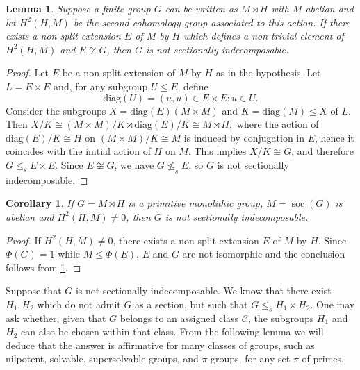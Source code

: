 \documentclass[10pt,a4paper]{amsart}
\newtheorem{corollary}[thm]{Corollary}
\newtheorem{lemma}[thm]{Lemma}
\DeclareMathOperator{\soc}{soc}
\begin{document}
\begin{lemma}\label{l:H2}
Suppose a finite group $G$ can be written as $M \rtimes H$ with $M$ abelian and let $H^2(H,M)$ be the second cohomology group associated to this action. If there exists a non-split extension $E$ of $M$ by $H$ which defines a non-trivial element of $H^2(H,M)$ and $E\not\cong G$, then $G$ is not sectionally indecomposable.
\end{lemma}
\begin{proof}
Let $E$ be a non-split extension of $M$ by $H$ as in the hypothesis. Let $L = E \times E$ and, for any subgroup $U \leq E$, define
$$\mathrm{diag}(U) = {(u,u) \in E \times E : u \in U}.$$
Consider the subgroups $X = \mathrm{diag}(E)(M \times M)$ and $K = \mathrm{diag}(M) \unlhd X$ of $L$. Then
$X/K \cong (M \times M)/K \rtimes \mathrm{diag}(E)/K \cong M \rtimes H,$
where the action of $\mathrm{diag}(E)/K \cong H$ on $(M \times M)/K \cong M$ is induced by conjugation in $E$, hence it coincides with the initial action of $H$ on $M$. This implies $X/K \cong G$, and therefore $G \leq_s E \times E$. Since $E \not\cong G$, we have $G \not\leq_s E$, so $G$ is not sectionally indecomposable.
\end{proof}





\begin{corollary}\label{l:H2m}
   If $G=M\rtimes H$ is a primitive monolithic group,  $M=\soc(G)$ is abelian and $H^2(H,M) \neq 0$, then $G$ is not sectionally indecomposable.
\end{corollary}
\begin{proof}
If $H^2(H,M) \neq 0$, there exists a non-split extension $E$ of $M$ by $H$. Since $\Phi(G) = 1$ while $M \leq \Phi(E)$, $E$ and $G$ are not isomorphic and the conclusion follows from \cref{l:H2}.
\end{proof}

Suppose that $G$ is not sectionally indecomposable. We know that there exist $H_1, H_2$ which do not admit $G$ as a section, 
but such that $G \leq_s H_1 \times H_2$. One may ask whether, given that 
$G$ belongs to an assigned class $\mathcal{C}$, the subgroups $H_1$ and 
$H_2$ can also be chosen within that class. From the following lemma we 
will deduce that the answer is affirmative for many classes of groups, 
such as nilpotent, solvable, supersolvable groups, and $\pi$-groups, for 
any set $\pi$ of primes.
\end{document}
